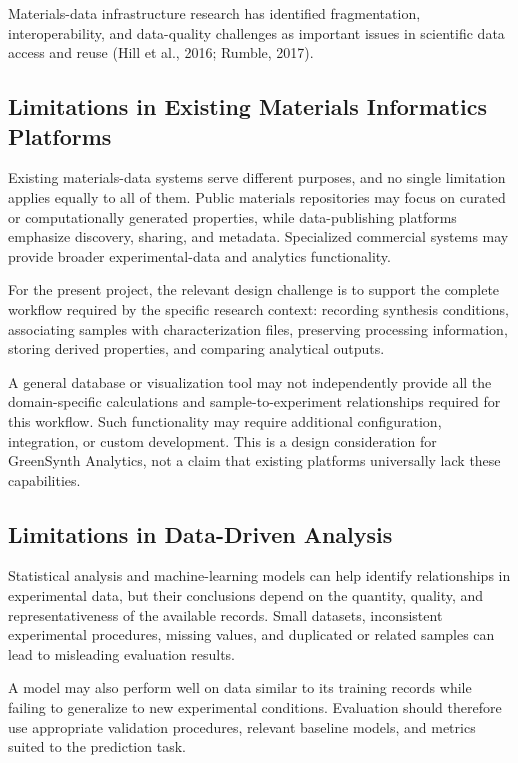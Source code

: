 \documentclass[12pt,a4paper,oneside]{report}
\begin{document}
{{{Materials-data infrastructure research has identified fragmentation, interoperability, and data-quality challenges as important issues in scientific data access and reuse (Hill et al., 2016; Rumble, 2017).

\subsection{Limitations in Existing Materials Informatics Platforms}

Existing materials-data systems serve different purposes, and no single limitation applies equally to all of them. Public materials repositories may focus on curated or computationally generated properties, while data-publishing platforms emphasize discovery, sharing, and metadata. Specialized commercial systems may provide broader experimental-data and analytics functionality.

For the present project, the relevant design challenge is to support the complete workflow required by the specific research context: recording synthesis conditions, associating samples with characterization files, preserving processing information, storing derived properties, and comparing analytical outputs.

A general database or visualization tool may not independently provide all the domain-specific calculations and sample-to-experiment relationships required for this workflow. Such functionality may require additional configuration, integration, or custom development. This is a design consideration for GreenSynth Analytics, not a claim that existing platforms universally lack these capabilities.

\subsection{Limitations in Data-Driven Analysis}

Statistical analysis and machine-learning models can help identify relationships in experimental data, but their conclusions depend on the quantity, quality, and representativeness of the available records. Small datasets, inconsistent experimental procedures, missing values, and duplicated or related samples can lead to misleading evaluation results.

A model may also perform well on data similar to its training records while failing to generalize to new experimental conditions. Evaluation should therefore use appropriate validation procedures, relevant baseline models, and metrics suited to the prediction task.

}}}
\end{document}
